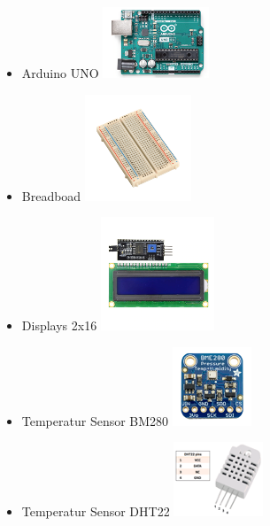 \documentclass[conference]{IEEEtran}
\begin{document}
\begin{itemize}
	\item Arduino UNO 
		\includegraphics[width=0.27\linewidth]{fig15}
	
	
\item Breadboad	
	\includegraphics[width=0.27\linewidth]{fig16}

	
\item Displays 2x16 
		\includegraphics[width=0.27\linewidth]{fig17}
	
	
\item Temperatur Sensor BM280 
 	\includegraphics[width=0.27\linewidth]{fig18}
	
	
\item Temperatur Sensor DHT22
	\includegraphics[width=0.27\linewidth]{fig19}
	

\end{itemize}
\end{document}
